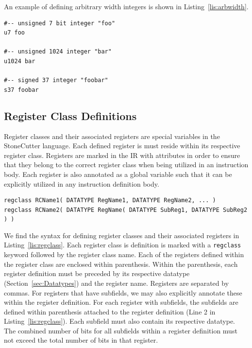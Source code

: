 \documentclass{article}
\begin{document}
An example of defining arbitrary width integers is shown in Listing~\ref{lis:arbwidth}.  

\vspace{0.125in}
\begin{lstlisting}[frame=single,style=base,caption={Arbitrary Width Datatypes},captionpos=b,label={lis:arbwidth}]
#-- unsigned 7 bit integer "foo"
u7 foo

#-- unsigned 1024 integer "bar"
u1024 bar

#-- signed 37 integer "foobar"
s37 foobar
\end{lstlisting}

\clearpage
\subsection{Register Class Definitions}
\label{sec:RegClassDef}

Register classes and their associated registers are special variables in the StoneCutter language.  Each defined register 
is must reside within its respective register class.  Registers are marked in the IR with attributes in order to ensure that 
they belong to the correct register class when being utilized in an instruction body.  Each register is also annotated as a global 
variable such that it can be explicitly utilized in any instruction definition body.

\vspace{0.125in}
\begin{lstlisting}[frame=single,style=base,caption={Register Class Definition Syntax},captionpos=b,label={lis:regclass}]
regclass RCName1( DATATYPE RegName1, DATATYPE RegName2, ... )
regclass RCName2( DATATYPE RegName( DATATYPE SubReg1, DATATYPE SubReg2 ) )
\end{lstlisting}

We find the syntax for defining register classes and their associated registers in Listing~\ref{lis:regclass}.  Each register 
class is definition is marked with a \texttt{regclass} keyword followed by the register class name.  Each of the registers 
defined within the register class are enclosed within parenthesis.  Within the parenthesis, each register definition must 
be preceded by its respective datatype (Section~\ref{sec:Datatypes}) and the register name.  Registers are separated 
by commas.  For registers that have subfields, we may also explicitly annotate these within the register definition.  For 
each register with subfields, the subfields are defined within parenthesis attached to the register definition 
(Line 2 in Listing~\ref{lis:regclass}).  Each subfield must also contain its respective datatype.  The combined number of bits for 
all subfields within a register definition must not exceed the total number of bits in that register.  
\end{document}
